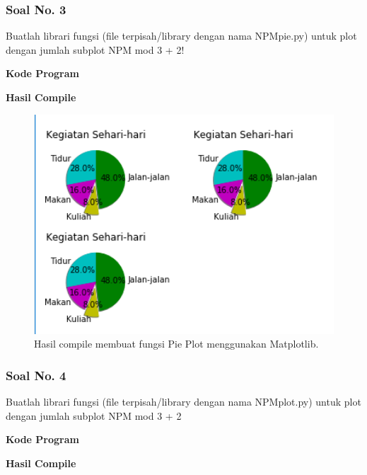 \subsubsection{Soal No. 3}
\hfill \break
Buatlah librari fungsi (file terpisah/library dengan nama NPMpie.py) untuk plot dengan jumlah subplot NPM mod 3 + 2!

\hfill \break
\textbf{Kode Program}



\hfill \break
\textbf{Hasil Compile}

\begin{figure}[H]
	\includegraphics[width=12cm]{figures/6/Praktek/1174039/p3.png}
	\centering
	\caption{Hasil compile membuat fungsi Pie Plot menggunakan Matplotlib.}
\end{figure}

\subsubsection{Soal No. 4}
\hfill \break
Buatlah librari fungsi (file terpisah/library dengan nama NPMplot.py) untuk plot dengan jumlah subplot NPM mod 3 + 2

\hfill \break
\textbf{Kode Program}



\hfill \break
\textbf{Hasil Compile}

